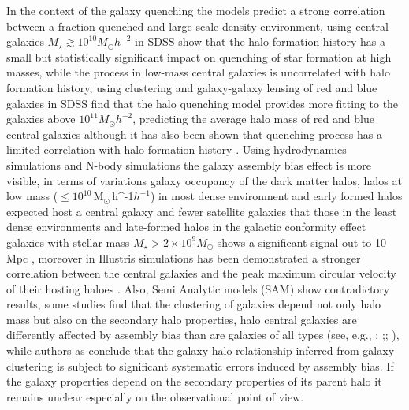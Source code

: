 \documentclass[fleqn,usenatbib]{mnras}
\newcommand{\Msunh}{\,{\rm M}$_{\odot}$\,\ifmmode h^{-1}\else $h^{-1}$\fi}
\begin{document}
In the context of the galaxy quenching the
models predict a strong correlation between a fraction quenched and
large scale density environment, using central galaxies $M_{\star}
\gtrsim 10^{10}M_\odot h^{-2}$ in SDSS \citet{2017MNRAS.472.2504T}
show that the halo formation history has a small but statistically
significant impact on quenching of star formation at high masses,
while the process in low-mass central galaxies is uncorrelated with
halo formation history, \citet{2016MNRAS.457.4360Z} using clustering
and galaxy-galaxy lensing of red and blue galaxies in SDSS find that
the halo quenching model provides more fitting to the galaxies above
$10^{11}M_\odot h^{-2}$, predicting the average halo mass of red and
blue central galaxies although it has also been shown that quenching
process has a limited correlation with halo formation history
\citep{2018MNRAS.478.4487T}. 
Using hydrodynamics simulations and
N-body simulations the galaxy assembly bias effect is more visible, in
terms of variations galaxy occupancy of the dark matter halos, halos
at low mass ($\leq 10^{10}$\Msunh) in most dense environment and early
formed halos expected host a central galaxy and fewer satellite
galaxies that those in the least dense environments and late-formed
halos \citep{2018MNRAS.480.3978A} in the galactic conformity effect
galaxies with stellar mass $M_\star > 2\times 10^9 M_\odot$ shows a
significant signal out to 10 Mpc \citep{2016MNRAS.455..185B}, moreover
in Illustris simulations has been demonstrated a stronger correlation
between the central galaxies and the peak maximum circular velocity of
their hosting haloes
\citep{2018arXiv181211210X}\citep{2005ApJ...630....1Z}. 
Also, Semi Analytic models (SAM) show contradictory results, some
studies find that the clustering of galaxies depend not only halo mass
but also on the secondary halo properties, halo central galaxies are
differently affected by assembly bias than are galaxies of all types
(see, e.g., \citep{2019MNRAS.486..582P};
\citep{2007MNRAS.374.1303C};\citep{2019MNRAS.484.1133C};
\citep{2014ApJ...794...74J}), while authors as
\citet{2014MNRAS.443.3044Z} conclude that the galaxy-halo relationship
inferred from galaxy clustering is subject to significant systematic
errors induced by assembly bias. If the galaxy properties depend on
the secondary properties of its parent halo it remains unclear
especially on the observational point of view.   
\end{document}

